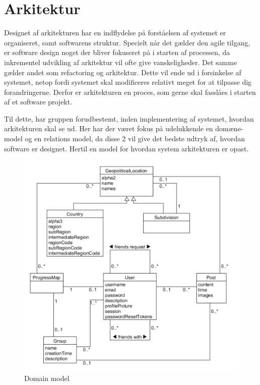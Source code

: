 \chapter{Arkitektur}\label{ch:Arkitektur}

Designet af arkitekturen har en indflydelse på forståelsen af systemet er organiseret, samt softwarens struktur. Specielt når det gælder den agile tilgang, er software design noget der bliver fokuseret på i starten af processen, da inkrementel udvikling af arkitektur vil ofte give vanskeligheder. Det samme gælder andet som refactoring og arkitektur. Dette vil ende ud i forsinkelse af systemet, netop fordi systemet skal modificeres relativt meget for at tilpasse dig forandringerne. Derfor er arkitekturen en proces, som gerne skal fasslåes i starten af et software projekt. \cite{Sommerville}

Til dette, har gruppen forudbestemt, inden implementering af systemet, hvordan arkitekturen skal se ud. Her har der været fokus på udelukkende en domæne-model og en relations model, da disse 2 vil give det bedste udtryk af, hvordan software er designet. Hertil en model for hvordan system arkitekturen er opast. 

\begin{figure}
    \includegraphics[width=\linewidth]{figures/Domain.png}
    \caption{Domain model}
    \label{fig:Domain}
\end{figure}


